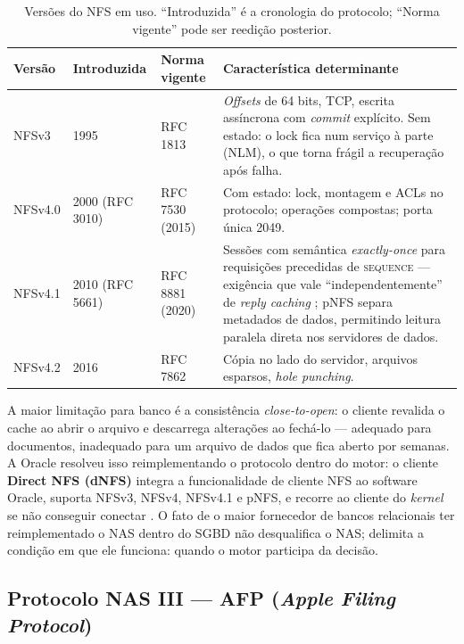 \documentclass[11pt,a4paper]{article}
\begin{document}
\begin{table}[H]
\centering
\caption{Versões do NFS em uso. ``Introduzida'' é a cronologia do protocolo; ``Norma vigente'' pode ser
reedição posterior.}
\label{tab:nfs}
{\footnotesize
\begin{tabular}{@{}L{1.3cm}L{2.3cm}L{2.3cm}L{8.8cm}@{}}
\toprule
\textbf{Versão} & \textbf{Introduzida} & \textbf{Norma vigente} & \textbf{Característica determinante} \\
\midrule
NFSv3 & 1995 & RFC 1813 & \textit{Offsets} de 64 bits, TCP, escrita assíncrona com \textit{commit} explícito. Sem estado: o lock fica num serviço à parte (NLM), o que torna frágil a recuperação após falha. \\
NFSv4.0 & 2000 (RFC 3010) & RFC 7530 (2015) & Com estado: lock, montagem e ACLs no protocolo; operações compostas; porta única 2049. \\
NFSv4.1 & 2010 (RFC 5661) & RFC 8881 (2020) & Sessões com semântica \textit{exactly-once} para requisições precedidas de \textsc{sequence} --- exigência que vale ``independentemente'' de \textit{reply caching} \cite{rfc8881}; pNFS separa metadados de dados, permitindo leitura paralela direta nos servidores de dados. \\
NFSv4.2 & 2016 & RFC 7862 & Cópia no lado do servidor, arquivos esparsos, \textit{hole punching}. \\
\bottomrule
\end{tabular}}
\end{table}

A maior limitação para banco é a consistência \textit{close-to-open}: o cliente revalida o cache ao
abrir o arquivo e descarrega alterações ao fechá-lo \cite{nfsman} --- adequado para documentos,
inadequado para um arquivo de dados que fica aberto por semanas. A Oracle resolveu isso
reimplementando o protocolo dentro do motor: o cliente \textbf{Direct NFS (dNFS)} integra a
funcionalidade de cliente NFS ao software Oracle, suporta NFSv3, NFSv4, NFSv4.1 e pNFS, e recorre ao
cliente do \textit{kernel} se não conseguir conectar \cite{oracledn}. O fato de o maior fornecedor de
bancos relacionais ter reimplementado o NAS dentro do SGBD não desqualifica o NAS; delimita a condição
em que ele funciona: quando o motor participa da decisão.

\subsection{Protocolo NAS III --- AFP (\textit{Apple Filing Protocol})}
\label{sec:afp}
\end{document}
